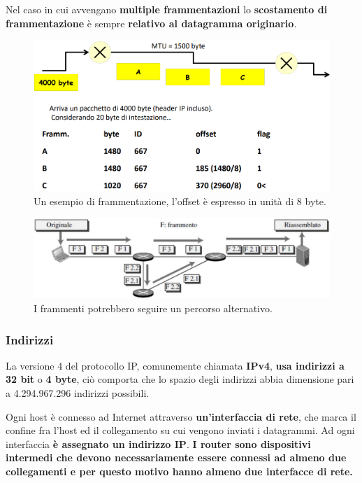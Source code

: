 \documentclass[11pt,a4paper,oneside]{book}
\theoremstyle{definition}
\begin{document}
\begin{itemize}
	      Nel caso in cui avvengano \textbf{multiple frammentazioni} lo \textbf{scostamento di frammentazione} è sempre \textbf{relativo al datagramma originario}.

	      \begin{figure}[!h]
		      \includegraphics[scale=0.3]{Immagini/Ip_frag.png}
		      \centering
		      \caption{Un esempio di frammentazione, l'offset è espresso in unità di 8 byte.}
	      \end{figure}

\end{itemize}

\pagebreak

\begin{figure}[!h]
	\includegraphics[scale=0.25]{Immagini/Ip_frag1.png}
	\centering
	\caption{I frammenti potrebbero seguire un percorso alternativo.}
\end{figure}

\subsubsection{Indirizzi}
La versione 4 del protocollo IP, comunemente chiamata \textbf{IPv4}, \textbf{usa indirizzi a 32 bit} o \textbf{4 byte}, ciò comporta che lo spazio degli indirizzi abbia dimensione pari a 4.294.967.296 indirizzi possibili.

Ogni host è connesso ad Internet attraverso \textbf{un'interfaccia di rete}, che marca il confine fra l'host ed il collegamento su cui vengono inviati i datagrammi. Ad ogni interfaccia \textbf{è assegnato un indirizzo IP}. \textbf{I router sono dispositivi intermedi che devono necessariamente essere connessi ad almeno due collegamenti e per questo motivo hanno almeno due interfacce di rete.}
\end{document}
